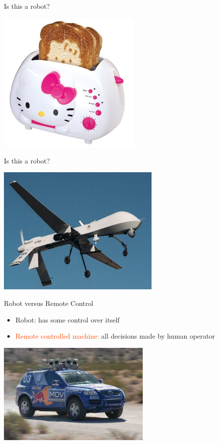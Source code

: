 \documentclass[color=pdftex,usenames,dvipsnames, aspectratio=169]{beamer}
\begin{document}
\begin{frame}{Is this a robot?}
\begin{center}
\includegraphics[width=7cm]{Images/hello-kitty-toaster.jpg}
\end{center}
\end{frame}

\begin{frame}{Is this a robot?}
\begin{center}
\includegraphics[width=0.6\textwidth]{Images/predator.jpg}
\end{center}
\end{frame}


\begin{frame}{Robot versus Remote Control}
\begin{itemize}
\item \textcolor{OliveGreen}{Robot:} has some control over itself
\item \textcolor{OrangeRed}{Remote controlled machine:} all decisions made by human operator
\end{itemize}

\begin{center}
\includegraphics[height=5cm]{Images/stanley.jpg}
\end{center}
\end{frame}
\end{document}
